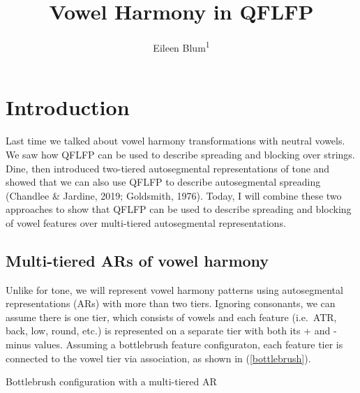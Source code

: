 \documentclass[,doc,floatsintext]{apa6}
\title{Vowel Harmony in QFLFP}
\author{Eileen Blum\textsuperscript{1}}
\date{}
\affiliation{
\vspace{0.5cm}
\textsuperscript{1} Rutgers University}
\theoremstyle{definition}
\theoremstyle{definition}
\theoremstyle{definition}
\theoremstyle{remark}
\begin{document}
\maketitle

\section{Introduction}\label{introduction}

Last time we talked about vowel harmony transformations with neutral
vowels. We saw how QFLFP can be used to describe spreading and blocking
over strings. Dine, then introduced two-tiered autosegmental
representations of tone and showed that we can also use QFLFP to
describe autosegmental spreading (Chandlee \& Jardine, 2019; Goldsmith,
1976). Today, I will combine these two approaches to show that QFLFP can
be used to describe spreading and blocking of vowel features over
multi-tiered autosegmental representations.

\subsection{Multi-tiered ARs of vowel
harmony}\label{multi-tiered-ars-of-vowel-harmony}

Unlike for tone, we will represent vowel harmony patterns using
autosegmental representations (ARs) with more than two tiers. Ignoring
consonants, we can assume there is one tier, which consists of vowels
and each feature (i.e.~ATR, back, low, round, etc.) is represented on a
separate tier with both its + and - minus values. Assuming a bottlebrush
feature configuraton, each feature tier is connected to the vowel tier
via association, as shown in (\ref{bottlebrush}).

\begin{exe}
\ex \label{bottlebrush} Bottlebrush configuration with a multi-tiered AR \\
\end{exe}
\end{document}
